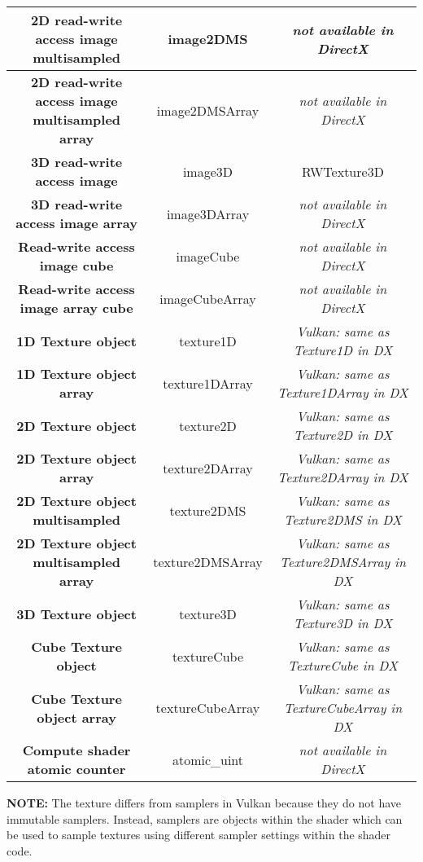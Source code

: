 \documentclass{article}
\begin{document}
\begin{table}[hp]
{\begin{tabular} { | c | c | c | }
	\textbf{2D read-write access image multisampled} & image2DMS & \textit{not available in DirectX} \\ \hline
	\textbf{2D read-write access image multisampled array} & image2DMSArray & \textit{not available in DirectX} \\ \hline
	\textbf{3D read-write access image} & image3D & RWTexture3D \\ \hline
	\textbf{3D read-write access image array} & image3DArray & \textit{not available in DirectX} \\ \hline
	\textbf{Read-write access image cube} & imageCube & \textit{not available in DirectX} \\ \hline
	\textbf{Read-write access image array cube} & imageCubeArray & \textit{not available in DirectX} \\ \hline
	\textbf{1D Texture object} & texture1D & \textit{Vulkan: same as Texture1D in DX} \\ \hline
	\textbf{1D Texture object array} & texture1DArray & \textit{Vulkan: same as Texture1DArray in DX} \\ \hline
	\textbf{2D Texture object} & texture2D & \textit{Vulkan: same as Texture2D in DX} \\ \hline
	\textbf{2D Texture object array} & texture2DArray & \textit{Vulkan: same as Texture2DArray in DX} \\ \hline
	\textbf{2D Texture object multisampled} & texture2DMS & \textit{Vulkan: same as Texture2DMS in DX}\\ \hline
	\textbf{2D Texture object multisampled array} & texture2DMSArray & \textit{Vulkan: same as Texture2DMSArray in DX} \\ \hline
	\textbf{3D Texture object} & texture3D & \textit{Vulkan: same as Texture3D in DX}\\ \hline
	\textbf{Cube Texture object} & textureCube & \textit{Vulkan: same as TextureCube in DX} \\ \hline
	\textbf{Cube Texture object array} & textureCubeArray & \textit{Vulkan: same as TextureCubeArray in DX} \\ \hline
	\textbf{Compute shader atomic counter} & atomic\_uint & \textit{not available in DirectX} \\ \hline
\end{tabular}
}
\end{table}
\clearpage

\textbf{NOTE:} The texture differs from samplers in Vulkan because they do not have immutable samplers. Instead, samplers are objects within the shader which can be used to sample textures using different sampler settings within the shader code. 
\end{document}
